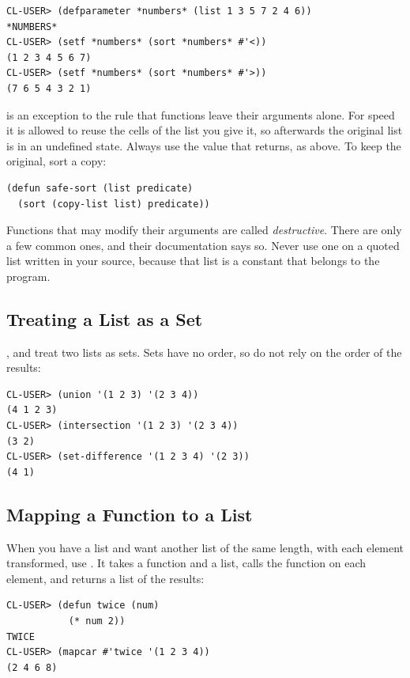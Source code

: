 \begin{verbatim}
CL-USER> (defparameter *numbers* (list 1 3 5 7 2 4 6))
*NUMBERS*
CL-USER> (setf *numbers* (sort *numbers* #'<))
(1 2 3 4 5 6 7)
CL-USER> (setf *numbers* (sort *numbers* #'>))
(7 6 5 4 3 2 1)
\end{verbatim}

 is an exception to the rule that functions leave their
arguments alone. For speed it is allowed to reuse the cells of the
list you give it, so afterwards the original list is in an undefined
state. Always use the value that  returns, as above. To
keep the original, sort a copy:

\begin{verbatim}
(defun safe-sort (list predicate)
  (sort (copy-list list) predicate))
\end{verbatim}

Functions that may modify their arguments are called
\emph{destructive}. There are only a few common ones, and their
documentation says so. Never use one on a quoted list written in your
source, because that list is a constant that belongs to the program.

\subsection{Treating a List as a Set}

,  and  treat two
lists as sets. Sets have no order, so do not rely on the order of the
results:

\begin{verbatim}
CL-USER> (union '(1 2 3) '(2 3 4))
(4 1 2 3)
CL-USER> (intersection '(1 2 3) '(2 3 4))
(3 2)
CL-USER> (set-difference '(1 2 3 4) '(2 3))
(4 1)
\end{verbatim}

\subsection{Mapping a Function to a List}

When you have a list and want another list of the same length, with
each element transformed, use . It takes a function and
a list, calls the function on each element, and returns a list of the
results:

\begin{verbatim}
CL-USER> (defun twice (num)
           (* num 2))
TWICE
CL-USER> (mapcar #'twice '(1 2 3 4))
(2 4 6 8)
\end{verbatim}

